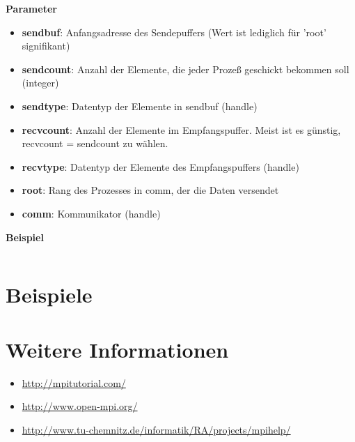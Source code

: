 \textbf{Parameter}
\begin{itemize}
    \item \textbf{sendbuf}: Anfangsadresse des Sendepuffers (Wert ist lediglich für 'root' signifikant) 
    \item \textbf{sendcount}: Anzahl der Elemente, die jeder Prozeß geschickt bekommen soll (integer) 
    \item \textbf{sendtype}: Datentyp der Elemente in sendbuf (handle) 
    \item \textbf{recvcount}: Anzahl der Elemente im Empfangspuffer. Meist ist es günstig, recvcount = sendcount zu wählen. 
    \item \textbf{recvtype}: Datentyp der Elemente des Empfangspuffers (handle) 
    \item \textbf{root}: Rang des Prozesses in comm, der die Daten versendet
    \item \textbf{comm}: Kommunikator (handle)
\end{itemize}

\textbf{Beispiel}
\inputminted[numbersep=5pt, tabsize=4]{c}{scripts/mpi/mpi-reduce-example.c}

\section{Beispiele}
\section{Weitere Informationen}
\begin{itemize}
    \item \url{http://mpitutorial.com/}
    \item \url{http://www.open-mpi.org/}
    \item \url{http://www.tu-chemnitz.de/informatik/RA/projects/mpihelp/}
\end{itemize}


